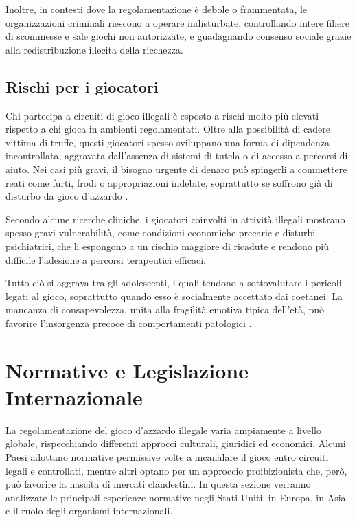 \documentclass[a4paper,12pt]{article}
\begin{document}
Inoltre, in contesti dove la regolamentazione è debole o frammentata, le organizzazioni criminali riescono a operare indisturbate, controllando intere filiere di scommesse e sale giochi non autorizzate, e guadagnando consenso sociale grazie alla redistribuzione illecita della ricchezza.

\subsection{Rischi per i giocatori}

Chi partecipa a circuiti di gioco illegali è esposto a rischi molto più elevati rispetto a chi gioca in ambienti regolamentati. Oltre alla possibilità di cadere vittima di truffe, questi giocatori spesso sviluppano una forma di dipendenza incontrollata, aggravata dall’assenza di sistemi di tutela o di accesso a percorsi di aiuto. Nei casi più gravi, il bisogno urgente di denaro può spingerli a commettere reati come furti, frodi o appropriazioni indebite, soprattutto se soffrono già di disturbo da gioco d’azzardo \cite{gorsane2017illegalacts}.

Secondo alcune ricerche cliniche, i giocatori coinvolti in attività illegali mostrano spesso gravi vulnerabilità, come condizioni economiche precarie e disturbi psichiatrici, che li espongono a un rischio maggiore di ricadute e rendono più difficile l’adesione a percorsi terapeutici efficaci.

Tutto ciò si aggrava tra gli adolescenti, i quali tendono a sottovalutare i pericoli legati al gioco, soprattutto quando esso è socialmente accettato dai coetanei. La mancanza di consapevolezza, unita alla fragilità emotiva tipica dell’età, può favorire l’insorgenza precoce di comportamenti patologici \cite{ferrara2019childrenrisk}.


\section{Normative e Legislazione Internazionale}

La regolamentazione del gioco d’azzardo illegale varia ampiamente a livello globale, rispecchiando differenti approcci culturali, giuridici ed economici. Alcuni Paesi adottano normative permissive volte a incanalare il gioco entro circuiti legali e controllati, mentre altri optano per un approccio proibizionista che, però, può favorire la nascita di mercati clandestini. In questa sezione verranno analizzate le principali esperienze normative negli Stati Uniti, in Europa, in Asia e il ruolo degli organismi internazionali.
\end{document}
